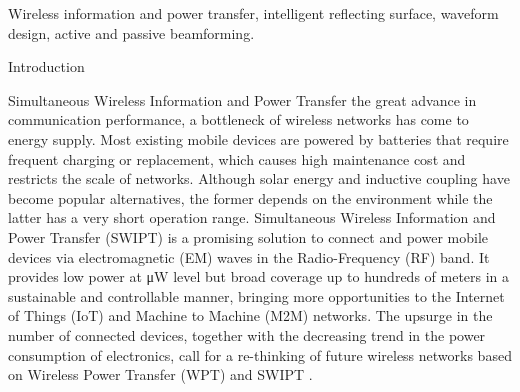 \documentclass[journal]{IEEEtran}
\begin{document}
	\begin{IEEEkeywords}
		Wireless information and power transfer, intelligent reflecting surface, waveform design, active and passive beamforming.
	\end{IEEEkeywords}


	\begin{section}{Introduction}
		\begin{subsection}{Simultaneous Wireless Information and Power Transfer}
			 the great advance in communication performance, a bottleneck of wireless networks has come to energy supply. Most existing mobile devices are powered by batteries that require frequent charging or replacement, which causes high maintenance cost and restricts the scale of networks. Although solar energy and inductive coupling have become popular alternatives, the former depends on the environment while the latter has a very short operation range. Simultaneous Wireless Information and Power Transfer (SWIPT) is a promising solution to connect and power mobile devices via electromagnetic (EM) waves in the Radio-Frequency (RF) band. It provides low power at \si{\uW} level but broad coverage up to hundreds of meters in a sustainable and controllable manner, bringing more opportunities to the Internet of Things (IoT) and Machine to Machine (M2M) networks. The upsurge in the number of connected devices, together with the decreasing trend in the power consumption of electronics, call for a re-thinking of future wireless networks based on Wireless Power Transfer (WPT) and SWIPT \cite{Clerckx2019}.


\end{subsection}
\end{section}
\end{document}
